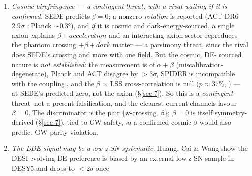 \documentclass[preprint,12pt]{elsarticle}
\begin{document}
\begin{enumerate}
  \((\mathrm{TTTEEE} -0.27\), \(lowl.\mathrm{TT} -0.23\), lowl.EE
  +0.17), confirming the foreground-marginalised
  \(plik_{\mathrm{lite}}\) result \((-0.43)\) to within the minimiser
  noise. So letting the foregrounds float does not reveal a hidden
  tension --- the standard-HDE early--late wall is simply absent for
  SEDE. \emph{Residual scope:} only the ACT DR6 \emph{primary}
  multifrequency likelihood remains not run (ACT \emph{lensing}, the
  DE-sensitive channel, is; §above) --- formally deferred under the
  pre-registered trigger (pre-registration §\ref{sec-E};
  \texttt{act\_\allowbreak dr6\_\allowbreak mflike} + multi-GB products not installed), with the
  falsifiable committed expectation
  \textbar{}\(\Delta \chi ^{2}\)\textbar{} \textless{} 1 given three
  concordant CMB datasets already at that level; a full MCMC for
  \(\Delta \mathrm{DIC}\) is deferred
  \((expected \approx  \Delta \chi ^{2}\), \(p_{\mathrm{D}}\) shared).
  The full primary likelihood is also folded \emph{into the joint}
  (§\ref{sec-5-1}).
\item
  \emph{Cosmic birefringence --- a contingent threat, with a rival
  waiting if it is confirmed.} SEDE predicts \(\beta  = 0\); a nonzero
  \emph{rotation} is reported (ACT DR6 \(2.9\sigma\)
  \citep{Diego-Palazuelos:2025dmh}; Planck ∼0.3°), and \emph{if} it is
  cosmic and dark-energy-sourced, a single axion explains
  \(\beta  + acceleration\) \citep{Lin:2025gne} and an interacting axion
  sector reproduces the phantom crossing \(+ \beta  + dark\) matter
  \citep{Barman:2025ryg} --- a parsimony threat, since the rival does
  SEDE's crossing and more with one field. But the cosmic, DE- sourced
  nature is \emph{not established}: the measurement is of
  \(\alpha  + \beta\) (miscalibration-degenerate), Planck and ACT
  disagree by \(>3\sigma\), SPIDER is incompatible with the coupling
  \citep{Yin:2025fmj}, and the \(\beta\) × LSS cross-correlation is null
  \((p \approx  37\)\%, \citep{Arcari:2025msx}) --- at SEDE's predicted
  zero, not the axion (§\ref{sec-7}). So this is a \emph{contingent}
  threat, not a present falsification, and the cleanest current channels
  favour \(\beta  = 0\). The discriminator is the pair \{w-crossing,
  \(\beta\)\}; \(\beta  = 0\) is itself symmetry-derived (§\ref{sec-7}),
  tied to GW-safety, so a confirmed cosmic \(\beta\) would also predict
  GW parity violation.
\item
  \emph{The DDE signal may be a low-z SN systematic.} Huang, Cai \& Wang
  \citep{Huang:2025som} show the DESI evolving-DE preference is biased
  by an external low-z SN sample in DESY5 and drops to \(<2\sigma\) once

\end{enumerate}
\end{document}
